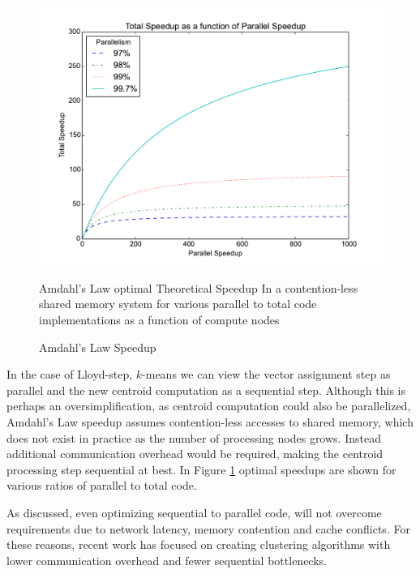 \begin{figure}
    \centerline{\includegraphics[width=.8\textwidth]{figs/speedup}}
    \caption{Amdahl's Law Speedup}{Amdahl's Law optimal Theoretical Speedup In a contention-less shared memory system for various
    parallel to total code implementations as a function of compute nodes}\label{aspeedups}
\end{figure}

In the case of Lloyd-step, $k$-means we can view the vector assignment step as parallel and the new centroid computation
as a sequential step.  Although this is perhaps an oversimplification, as centroid computation could also be
parallelized, Amdahl's Law speedup assumes contention-less accesses to shared memory, which does not exist in practice
as the number of processing nodes grows.  Instead additional communication overhead would be required, making the
centroid processing step sequential at best.  In Figure \ref{aspeedups} optimal speedups are shown for various ratios of
parallel to total code.

As discussed, even optimizing sequential to parallel code, will not overcome requirements due to network latency, 
memory contention and cache conflicts.  For these reasons,  recent work has focused on creating clustering
algorithms with lower communication overhead and fewer sequential bottlenecks. 

